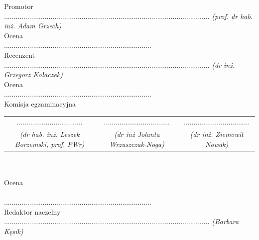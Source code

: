\documentclass[a4paper, twoside, openright, 12pt]{report}
\begin{document}

\null\newpage

\cleardoublepage

\thispagestyle{empty}
\begin{center}
    \vfill
    \doublespacing
    \Large{Promotor} \\
    \singlespacing
    ..........................................................................................................
    \doublespacing
    \small\emph{(prof. dr hab. inż. Adam Grzech)} \\
    \large{Ocena} \\
    ............................................................................ \\
    \vspace{15mm}
    \Large{Recenzent} \\
    \singlespacing
    ..........................................................................................................
    \doublespacing
    \small\emph{(dr inż. Grzegorz Kołaczek)} \\
    \large{Ocena} \\
    ............................................................................ \\

    \vspace{15mm}
    \Large{Komisja egzaminacyjna} \\
    \singlespacing
    \begin{tabular}{c c c}
    .................................. &  .................................. & .................................. \\
    \doublespacing
    \footnotesize\emph{(dr hab. inż. Leszek Borzemski, prof. PWr)} & \footnotesize\emph{(dr inż Jolanta Wrzuszczak-Noga)} & \footnotesize\emph{(dr inż. Ziemowit Nowak)}\\
    \end{tabular}
    \\
    \hfill \\
    \large{Ocena} \\
    \hfill \\
    ............................................................................ \\

    \vspace{15mm}
    \Large{Redaktor naczelny} \\
    \singlespacing
    ..........................................................................................................
    \doublespacing
    \small\emph{(Barbara Kęsik)} \\
    \vfill
\end{center}
\cleardoublepage
\end{document}
